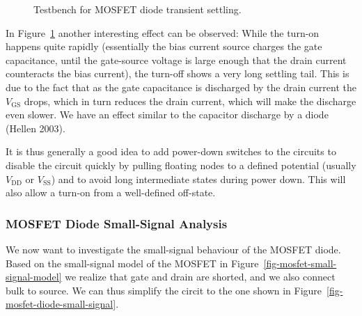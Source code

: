 \documentclass[
  a4paper,
  DIV=11,
  numbers=noendperiod]{scrartcl}
\begin{document}
\begin{figure}


\caption{\label{fig-mosfet-diode-settling-tb}Testbench for MOSFET diode
transient settling.}

\end{figure}%

In Figure~\ref{fig-mosfet-diode-settling-tb} another interesting effect
can be observed: While the turn-on happens quite rapidly (essentially
the bias current source charges the gate capacitance, until the
gate-source voltage is large enough that the drain current counteracts
the bias current), the turn-off shows a very long settling tail. This is
due to the fact that as the gate capacitance is discharged by the drain
current the \(V_\mathrm{GS}\) drops, which in turn reduces the drain
current, which will make the discharge even slower. We have an effect
similar to the capacitor discharge by a diode (Hellen 2003).

It is thus generally a good idea to add power-down switches to the
circuits to disable the circuit quickly by pulling floating nodes to a
defined potential (usually \(V_\mathrm{DD}\) or \(V_\mathrm{SS}\)) and
to avoid long intermediate states during power down. This will also
allow a turn-on from a well-defined off-state.

\subsubsection{MOSFET Diode Small-Signal
Analysis}\label{mosfet-diode-small-signal-analysis}

We now want to investigate the small-signal behaviour of the MOSFET
diode. Based on the small-signal model of the MOSFET in
Figure~\ref{fig-mosfet-small-signal-model} we realize that gate and
drain are shorted, and we also connect bulk to source. We can thus
simplify the circit to the one shown in
Figure~\ref{fig-mosfet-diode-small-signal}.
\end{document}
